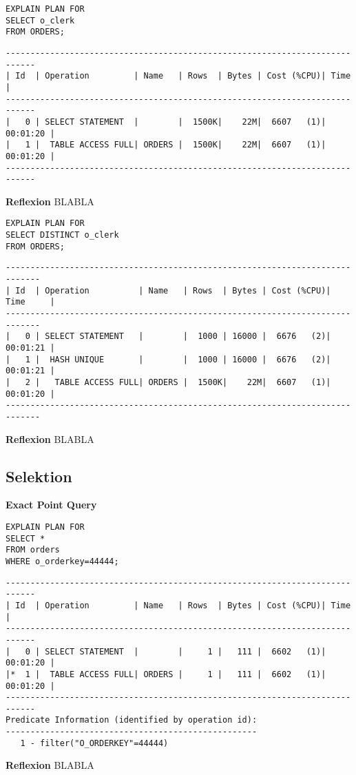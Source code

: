 \documentclass[10pt]{article}
\begin{document}
\begin{lstlisting}[style=sql]
EXPLAIN PLAN FOR
SELECT o_clerk
FROM ORDERS;
\end{lstlisting}
\begin{lstlisting}[style=queryexecutionplan]
----------------------------------------------------------------------------
| Id  | Operation         | Name   | Rows  | Bytes | Cost (%CPU)| Time     |
----------------------------------------------------------------------------
|   0 | SELECT STATEMENT  |        |  1500K|    22M|  6607   (1)| 00:01:20 |
|   1 |  TABLE ACCESS FULL| ORDERS |  1500K|    22M|  6607   (1)| 00:01:20 |
----------------------------------------------------------------------------
\end{lstlisting}
\textbf{Reflexion} \newline
BLABLA

\begin{lstlisting}[style=sql]
EXPLAIN PLAN FOR
SELECT DISTINCT o_clerk
FROM ORDERS;
\end{lstlisting}
\begin{lstlisting}[style=queryexecutionplan]
-----------------------------------------------------------------------------
| Id  | Operation          | Name   | Rows  | Bytes | Cost (%CPU)| Time     |
-----------------------------------------------------------------------------
|   0 | SELECT STATEMENT   |        |  1000 | 16000 |  6676   (2)| 00:01:21 |
|   1 |  HASH UNIQUE       |        |  1000 | 16000 |  6676   (2)| 00:01:21 |
|   2 |   TABLE ACCESS FULL| ORDERS |  1500K|    22M|  6607   (1)| 00:01:20 |
-----------------------------------------------------------------------------
\end{lstlisting}
\textbf{Reflexion} \newline
BLABLA

\subsection{Selektion}
\textbf{Exact Point Query}
\begin{lstlisting}[style=sql]
EXPLAIN PLAN FOR
SELECT *
FROM orders
WHERE o_orderkey=44444;
\end{lstlisting}
\begin{lstlisting}[style=queryexecutionplan]
----------------------------------------------------------------------------
| Id  | Operation         | Name   | Rows  | Bytes | Cost (%CPU)| Time     |
----------------------------------------------------------------------------
|   0 | SELECT STATEMENT  |        |     1 |   111 |  6602   (1)| 00:01:20 |
|*  1 |  TABLE ACCESS FULL| ORDERS |     1 |   111 |  6602   (1)| 00:01:20 |
----------------------------------------------------------------------------
Predicate Information (identified by operation id):
---------------------------------------------------
   1 - filter("O_ORDERKEY"=44444)
\end{lstlisting}
\textbf{Reflexion} \newline
BLABLA
\end{document}
